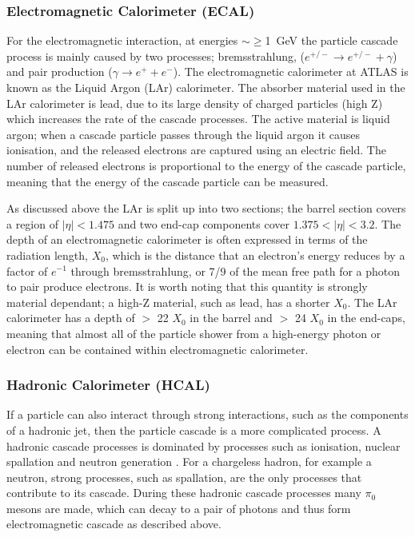 \subsubsection{Electromagnetic Calorimeter (ECAL)}

For the electromagnetic interaction, at energies $\sim \geq$\SI{1}{\GeV} the particle cascade process is mainly caused by two processes;
bremsstrahlung, ($e^{+/-} \to e^{+/-} + \gamma$) and pair production ($\gamma \to e^{+} + e^{-}$).
The electromagnetic calorimeter at ATLAS is known as the Liquid Argon (LAr) calorimeter.
The absorber material used in the LAr calorimeter is lead, due to its large density of charged particles (high Z)
which increases the rate of the cascade processes.
The active material is liquid argon;
when a cascade particle passes through the liquid argon it causes ionisation,
and the released electrons are captured using an electric field.
The number of released electrons is proportional to the energy of the cascade particle,
meaning that the energy of the cascade particle can be measured. 

As discussed above the LAr is split up into two sections;
the barrel section covers a region of $|\eta| < 1.475$ and two end-cap components cover $1.375 < |\eta| < 3.2$.
The depth of an electromagnetic calorimeter is often expressed in terms of the radiation length, $X_{0}$,
which is the distance that an electron's energy reduces by a factor of $e^{-1}$ through bremsstrahlung,
or 7/9 of the mean free path for a photon to pair produce electrons.
It is worth noting that this quantity is strongly material dependant;
a high-Z material, such as lead, has a shorter $X_0$.
The LAr calorimeter has a depth of $>$ 22 $X_{0}$ in the barrel and $>$ 24 $X_{0}$ in the end-caps,
meaning that almost all of the particle shower from a high-energy photon
or electron can be contained within electromagnetic calorimeter. 

\subsubsection{Hadronic Calorimeter (HCAL)}

If a particle can also interact through strong interactions, such as the components of a hadronic jet,
then the particle cascade is a more complicated process.
A hadronic cascade processes is dominated by processes such as
ionisation, nuclear spallation and neutron generation \cite{det-nuclearInt_book, det-thesis_kate}.
For a chargeless hadron, for example a neutron,
strong processes, such as spallation, are the only processes that contribute to its cascade.
During these hadronic cascade processes many $\pi_0$ mesons are made,
which can decay to a pair of photons and thus form electromagnetic cascade as described above. 

